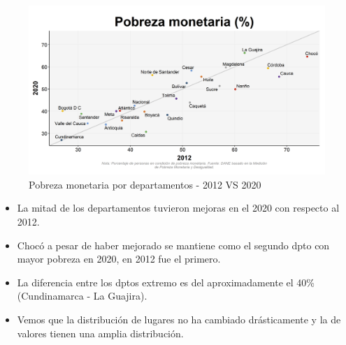     \begin{figure}[H]
        \caption{Pobreza monetaria por departamentos - 2012 VS 2020 \label{map_result_2} }
        \begin{center}
        \includegraphics[width=\textwidth,keepaspectratio]{img/var_262_scatter_time.png}
        \end{center}
    \end{figure}
            \begin{itemize}
                    \item La mitad de los departamentos tuvieron mejoras en el 2020 con respecto al 2012.
                    \item Chocó a pesar de haber mejorado se mantiene como el segundo dpto con mayor pobreza en 2020, en 2012 fue el primero.
                    \item La diferencia entre los dptos extremo es del aproximadamente el 40\% (Cundinamarca - La Guajira).
                    \item Vemos que la distribución de lugares no ha cambiado drásticamente y la de valores tienen una amplia distribución.
                    \end{itemize}

